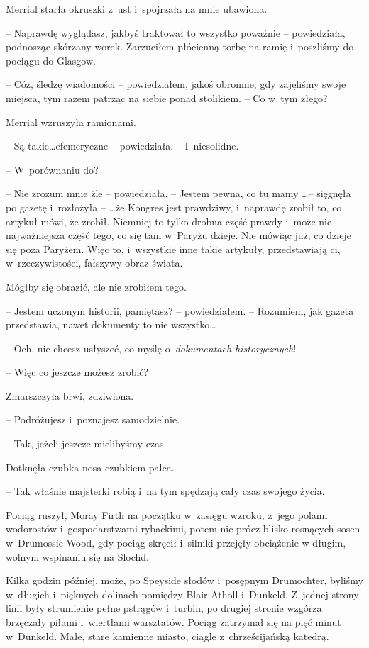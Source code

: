 \documentclass[oneside,polish,11pt,sfheadings]{mwbk}
\begin{document}
Merrial starła okruszki z~ust i~spojrzała na mnie ubawiona. 

-- Naprawdę wyglądasz, jakbyś traktował to wszystko poważnie -- powiedziała,
podnosząc skórzany worek. Zarzuciłem płócienną torbę na ramię i~poszliśmy do pociągu do Glasgow.

-- Cóż, śledzę wiadomości -- powiedziałem, jakoś obronnie, gdy zajęliśmy
swoje miejsca, tym razem patrząc na siebie ponad stolikiem. -- Co w~tym
złego?

Merrial wzruszyła ramionami. 

-- Są takie\ldots efemeryczne -- powiedziała. -- I~niesolidne.

-- W~porównaniu do?

-- Nie zrozum mnie źle -- powiedziała. -- Jestem pewna, co tu mamy \ldots -- sięgnęła po gazetę i~rozłożyła -- \ldots że Kongres jest prawdziwy, i~naprawdę
zrobił to, co artykuł mówi, że zrobił. Niemniej to tylko drobna część
prawdy i~może nie najważniejsza część tego, co się tam w~Paryżu dzieje.
Nie mówiąc już, co dzieje się poza Paryżem. Więc to, i~wszystkie inne
takie artykuły, przedstawiają ci, w~rzeczywistości, fałszywy obraz
świata.

Mógłby się obrazić, ale nie zrobiłem tego. 

-- Jestem uczonym historii,
pamiętasz? -- powiedziałem. -- Rozumiem, jak gazeta przedstawia, nawet
dokumenty to nie wszystko\ldots

-- Och, nie chcesz usłyszeć, co myślę o~\textit{dokumentach historycznych}!

-- Więc co jeszcze możesz zrobić?

Zmarszczyła brwi, zdziwiona. 

-- Podróżujesz i~poznajesz samodzielnie.

-- Tak, jeżeli jeszcze mielibyśmy czas.

Dotknęła czubka nosa czubkiem palca. 

-- Tak właśnie majsterki robią i~na
tym spędzają cały czas swojego życia.

Pociąg ruszył, Moray Firth na początku w~zasięgu wzroku, z~jego polami
wodorostów i~gospodarstwami rybackimi, potem nic prócz blisko rosnących
sosen w~Drumossie Wood, gdy pociąg skręcił i~silniki przejęły obciążenie
w długim, wolnym wspinaniu się na Slochd.

Kilka godzin później, może, po Speyside słodów i~posępnym Drumochter,
byliśmy w~długich i~pięknych dolinach pomiędzy Blair Atholl i~Dunkeld. Z~jednej strony linii były strumienie pełne pstrągów i~turbin, po drugiej
stronie wzgórza brzęczały piłami i~wiertłami warsztatów. Pociąg
zatrzymał się na pięć minut w~Dunkeld. Małe, stare kamienne miasto,
ciągle z~chrześcijańską katedrą.
\end{document}
